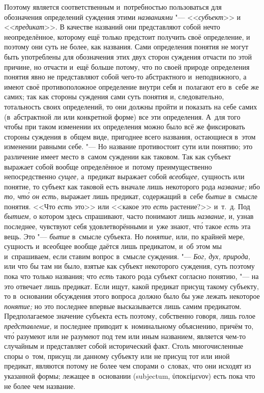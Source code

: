 Поэтому является соответственным и~потребностью пользоваться
для обозначения определений суждения этими
{\em названиями} "--- <<{\em субъект}>> и <<{\em предикат}>>.
В качестве названий они представляют собой нечто
неопределённое, которому ещё только предстоит получить своё определение, и
поэтому они суть не более, как названия. Сами определения понятия не могут
быть употреблены для обозначения этих двух сторон суждения отчасти по этой
причине, но отчасти и~ещё больше потому, что по своей природе определения
понятия явно не представляют собой чего-то абстрактного и~неподвижного, а
имеют своё противоположное определение внутри себя и~полагают его в~себе же
самих; так как стороны суждения сами суть понятия и,
следовательно, тотальность своих определений, то они должны пройти и
показать на себе самих (в~абстрактной ли или конкретной форме) все эти
определения. А~для того чтобы при таком изменении их определения можно было
всё же фиксировать стороны суждения в~общем виде, пригоднее всего названия,
остающиеся в~этом изменении равными себе. "--- Но название
противостоит сути или понятию; это различение имеет место в~самом суждении
как таковом. Так как субъект выражает собой вообще определённое и~потому
преимущественно непосредственно {\em сущее,} а~предикат
выражает собой {\em всеобщее,}
сущность или понятие, то субъект как таковой есть вначале
лишь некоторого рода {\em название;} ибо {\em то, чт\'{о} он есть,}
выражает лишь предикат, содержащий в~себе {\em бытие} в~смысле
понятия. <<Что {\em есть} это>> или <<какое это {\em есть} растение?>>
и~т.~д. Под {\em бытием,}
о котором здесь спрашивают, часто понимают лишь {\em название,} и, узнав
последнее, чувствуют себя удовлетворёнными и~уже знают, чт\'{о} такое
{\em есть} эта вещь. Это "--- {\em бытие} в~смысле субъекта. Но
{\em понятие},
или, по крайней мере, сущность и~всеобщее вообще даётся лишь
предикатом, и~об этом мы и~спрашиваем, если ставим вопрос в~смысле
суждения. "--- {\em Бог, дух, природа,} или что бы
там ни было, взятые как субъект некоторого суждения, суть поэтому пока что
только названия; что {\em есть} такого рода субъект согласно понятию, "--- на
это отвечает лишь предикат. Если ищут, какой предикат присущ такому субъекту,
то в~основании обсуждения этого вопроса должно было бы уже лежать некоторое
{\em понятие;} но это последнее впервые высказывается лишь
самим предикатом. Предполагаемое значение субъекта есть
поэтому, собственно говоря, лишь голое {\em представление,}
и последнее приводит к~номинальному объяснению, причём то, чт\'{о} разумеют
или не разумеют под тем или иным названием, является чем-то случайным и
представляет собой исторический факт. Столь многочисленные споры о~том,
присущ ли данному субъекту или не присущ тот или иной предикат, являются
потому не более чем спорами о~словах, что они исходят из указанной формы;
лежащее в~основании (subjectum, \textgreek{ὑποκείμενον}) есть пока
что не более чем название.

